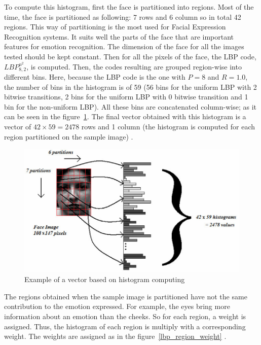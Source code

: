 \noindent To compute this histogram, first the face is partitioned into regions. Most of the time, the face is partitioned as following: 7 rows and 6 column so in total 42 regions. This way of partitioning is the most used for Facial Expression Recognition systems. It suits well the parts of the face that are important features for emotion recognition. The dimension of the face for all the images tested should be kept constant. Then for all the pixels of the face, the LBP code, $ LBP_{8,2}^{u^2} $, is computed. Then, the codes resulting are grouped region-wise into different bins. Here, because the LBP code is the one with $ P = 8 $ and $ R = 1.0 $, the number of bins in the histogram is of 59 (56 bins for the uniform LBP with 2 bitwise transitions, 2 bins for the uniform LBP with 0 bitwise transition and 1 bin for the non-uniform LBP). All these bins are concatenated column-wise; as it can be seen in the figure~\ref{lbp_histogram}. The final vector obtained with this histogram is a vector of $ 42\times59 = 2478 $ rows and 1 column (the histogram is computed for each region partitioned on the sample image) \cite{GAN08}.
\newline

\begin{figure}[!h]
\begin{center}
\noindent \includegraphics[scale=0.5]{figures/lbp_histogram} 
\newline
\caption{Example of a vector based on histogram computing}
\label{lbp_histogram}
\end{center} 
\end{figure}

\noindent The regions obtained when the sample image is partitioned have not the same contribution to the emotion expressed. For example, the eyes bring more information about an emotion than the cheeks. So for each region, a weight is assigned. Thus, the histogram of each region is multiply with a corresponding weight. The weights are assigned as in the figure~\ref{lbp_region_weight} \cite{GAN08}.
\newline

